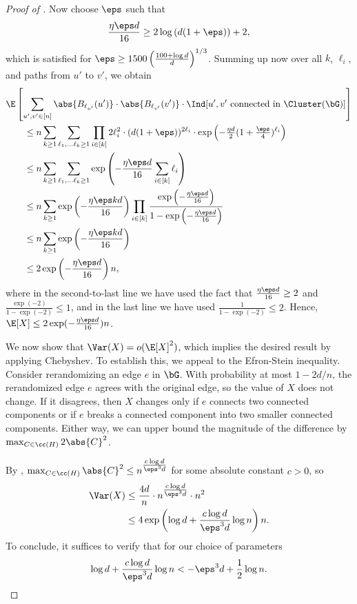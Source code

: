 \documentclass[11pt,letterpaper]{article}
\begin{document}
\begin{proof}[Proof of ]
    Now choose $\eps$ such that 
    \[
        \frac{\eta \eps d}{16} \ge 2 \log \left( d (1+\eps) \right) + 2, 
    \]
    which is satisfied for $\eps \ge 1500 \left( \frac{100+\log d}{d} \right)^{1/3}$. 
    Summing up now over all $k$, $\ell_i$, and paths from $u'$ to $v'$, we obtain 
    \begin{align*}
        &\E\left[\sum_{u', v' \in [n]} \abs{B_{\ell_{u'}}(u')} \cdot \abs{B_{\ell_{v'}}(v')} \cdot \Ind[u', v' \text{ connected in } \Cluster(\bG)] \right] \\
        &\quad\quad \le n \sum_{k \ge 1} \sum_{\ell_1, \ldots \ell_k \ge 1}  \prod_{i \in [k]} 2\ell_i^2 \cdot (d(1+\eps))^{2\ell_i} \cdot \exp\left(-\tfrac{\eta d}{2}(1+\tfrac{\eps}{4})^{\ell_i}\right) \\
        &\quad\quad \le n \sum_{k \ge 1} \sum_{\ell_1, \ldots \ell_k \ge 1}  \exp\left(-\frac{\eta \eps d}{16} \sum_{i \in [k]} \ell_i\right) \\
        &\quad\quad \le n \sum_{k \ge 1} \exp\left(-\frac{\eta \eps kd}{16}\right) \prod_{i \in [k]} \frac{\exp\left(-\frac{\eta \eps d}{16}\right)}{1 - \exp\left(-\frac{\eta \eps d}{16}\right)} \\
        &\quad\quad \le n \sum_{k \ge 1} \exp\left(-\frac{\eta \eps kd}{16}\right) \\
        &\quad\quad \le 2\exp\left(-\frac{\eta \eps d}{16}\right)n,
    \end{align*}
    where in the second-to-last line we have used the fact that $\frac{\eta \eps d}{16} \ge 2$ and $\tfrac{\exp(-2)}{1-\exp(-2)} \le 1$, and in the last line we have used $\tfrac{1}{1-\exp(-2)} \le 2$.
    Hence, $\E[X] \le 2\exp(-\tfrac{\eta \eps d}{16})n$.

    We now show that $\Var(X) = o(\E[X]^2)$, which implies the desired result by applying Chebyshev. 
    To establish this, we appeal to the Efron-Stein inequality.
    Consider rerandomizing an edge $e$ in $\bG$. 
    With probability at most $1 - 2d/n$, the rerandomized edge $e$ agrees with the original edge, so the value of $X$ does not change. 
    If it disagrees, then $X$ changes only if $e$ connects two connected components or if $e$ breaks a connected component into two smaller connected components.
    Either way, we can upper bound the magnitude of the difference by $\max_{C \in \cc(H)} 2\abs{C}^2$. 
    
    By , $\max_{C \in \cc(H)} \abs{C}^2 \le n^{\tfrac{c\log d}{\eps^3 d}}$ for some absolute constant $c > 0$, so 
    \begin{align*}
        \Var(X) &\le \frac{4d}{n} \cdot n^{\tfrac{c\log d}{\eps^3 d}} \cdot n^2 \\
        &\le 4\exp\left(\log d + \frac{c \log d}{\eps^3 d} \log n\right) n.
    \end{align*}
    To conclude, it suffices to verify that for our choice of parameters 
    \[
        \log d + \frac{c \log d}{\eps^3 d} \log n < -\eps^3 d + \frac{1}{2} \log n.
    \]


\end{proof}
\end{document}
